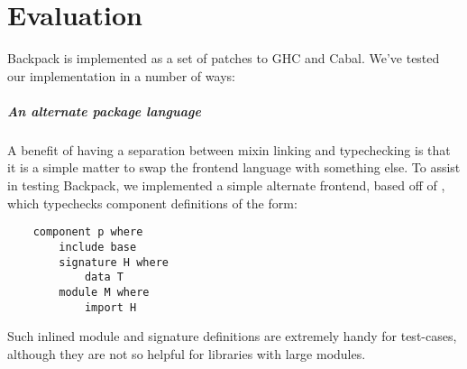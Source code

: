 

\chapter{Evaluation}
\label{sec:evaluation}

Backpack is implemented as a set of patches to GHC and Cabal.
We've tested our implementation in a number of ways:

\paragraph{An alternate package language}  A benefit of having
a separation between mixin linking and typechecking is that it is
a simple matter to swap the frontend language with something else.
To assist in testing Backpack, we implemented a simple alternate
frontend, based off of \OldBackpack{}, which typechecks component
definitions of the form:

\begin{verbatim}
    component p where
        include base
        signature H where
            data T
        module M where
            import H
\end{verbatim}
%
Such inlined module and signature definitions
are extremely handy for test-cases, although
they are not so helpful for libraries with large modules.

